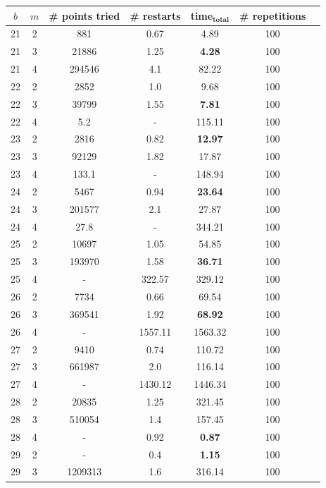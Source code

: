 \documentclass[thesis=M,english]{FITthesis}[2012/10/20]
\theoremstyle{remark}
\theoremstyle{definition}
\begin{document}
\begin{table}[H]
\centering
\begin{tabular}{ |c||c|c|c|c|c|c| } 
 \hline
$b$ & $m$ & \# points tried & \# restarts & \textbf{time}$_\textbf{total}$ & \# repetitions \\
 \hline
 \hline
21 & 2 & 881 & 0.67 & 4.89 & 100 \\ \hline
21 & 3 & 21886 & 1.25 & \textbf{4.28} & 100 \\ \hline 
21 & 4 & 294546 & 4.1 & 82.22 & 100 \\ \hline \hline 
22 & 2 & 2852 & 1.0 & 9.68 & 100 \\ \hline 
22 & 3 & 39799 & 1.55 & \textbf{7.81} & 100 \\ \hline 
22 & 4 & 5.2 & - & 115.11 & 100 \\ \hline \hline
23 & 2 & 2816 & 0.82 & \textbf{12.97} & 100 \\ \hline
23 & 3 & 92129 & 1.82 & 17.87 & 100 \\ \hline
23 & 4 & 133.1 & - & 148.94 & 100 \\ \hline \hline
24 & 2 & 5467 & 0.94 & \textbf{23.64 }& 100 \\ \hline 
24 & 3 & 201577 & 2.1 & 27.87 & 100 \\ \hline
24 & 4 & 27.8 &- & 344.21 & 100 \\ \hline \hline
25 & 2 & 10697 & 1.05 & 54.85 & 100 \\ \hline 
25 & 3 & 193970 & 1.58 & \textbf{36.71} & 100 \\ \hline 
25 & 4 &- & 322.57 & 329.12 & 100 \\ \hline \hline 
26 & 2 & 7734 & 0.66 & 69.54 & 100 \\ \hline 
26 & 3 & 369541 & 1.92 & \textbf{68.92} & 100 \\ \hline
26 & 4 & - & 1557.11 & 1563.32 & 100 \\ \hline \hline
27 & 2 & 9410 & 0.74 & 110.72 & 100 \\ \hline 
27 & 3 & 661987 & 2.0 & 116.14 & 100 \\ \hline 
27 & 4 & - & 1430.12 & 1446.34 & 100 \\ \hline  \hline
28 & 2 & 20835 & 1.25 & 321.45 & 100 \\ \hline 
28 & 3 & 510054 & 1.4 & 157.45 & 100 \\ \hline 
28 & 4 & - & 0.92 & \textbf{0.87} & 100 \\ \hline \hline
29 & 2 & - & 0.4 & \textbf{1.15} & 100 \\ \hline 
29 & 3 & 1209313 & 1.6 & 316.14 & 100 \\ \hline 

\end{tabular}
\end{table}
\end{document}
